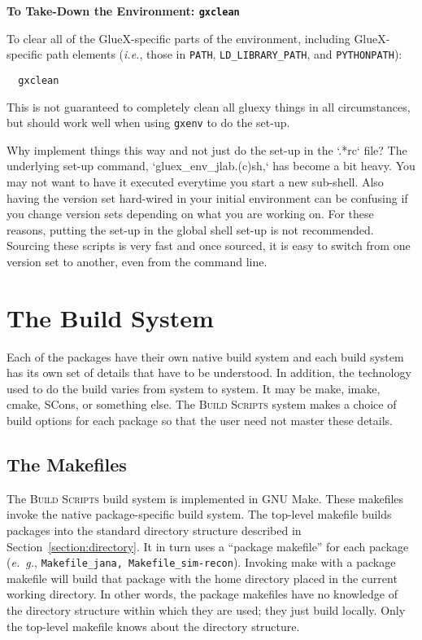 \documentclass[12pt]{article}
\newcommand{\bs}{\textsc{Build Scripts}}
\begin{document}
\begin{description}
\begin{description}
\item{\bf To Take-Down the Environment: {\tt gxclean}}

To clear all of the GlueX-specific parts of the environment, including
GlueX-specific path elements ({\it i.e.}, those in {\tt PATH}, {\tt LD\_LIBRARY\_PATH}, and {\tt PYTHONPATH}):
\begin{verbatim}
  gxclean
\end{verbatim}
This is not guaranteed to completely clean all gluexy things in all
circumstances, but should work well when using {\tt gxenv} to do the
set-up.

\end{description}
\end{description}

Why implement things this way and not just do the set-up in the `.*rc`
file? The underlying set-up command, `gluex\_env\_jlab.(c)sh,` has
become a bit heavy. You may not want to have it executed everytime you
start a new sub-shell. Also having the version set hard-wired in your
initial environment can be confusing if you change version sets
depending on what you are working on. For these reasons, putting the
set-up in the global shell set-up is not recommended. Sourcing these
scripts is very fast and once sourced, it is easy to switch from one
version set to another, even from the command line.

\section{The Build System}

Each of the packages have their own native build system and each build
system has its own set of details that have to be understood. In
addition, the technology used to do the build varies from system to
system. It may be make, imake, cmake, SCons, or something else. The
\bs{} system makes a choice of build options for each package so that
the user need not master these details.

\subsection{The Makefiles}

The \bs{} build system is implemented in GNU Make. These makefiles
invoke the native package-specific build system. The top-level
makefile builds packages into the standard directory structure
described in Section~\ref{section:directory}. It in turn uses a
``package
makefile'' for each package ({\it e.~g.}, {\tt Makefile\_jana,
  Makefile\_sim-recon}). Invoking make with a package makefile will
build that package with the home directory placed in the current
working directory. In other words, the package makefiles have no knowledge of
the directory structure within which they are used; they just build
locally. Only the top-level makefile knows about the directory structure.
\end{document}
